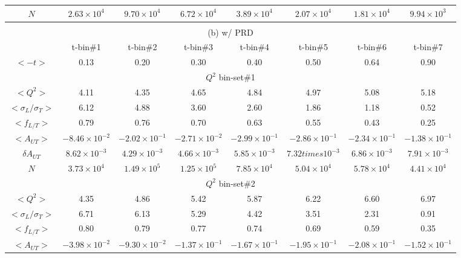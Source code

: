 \begin{table}[!ht]
\begin{tabular}{|c|c|c|c|c|c|c|c|}
	   $N$                     & $2.63\times 10^{4}$   &$9.70\times 10^{4}$   & $6.72\times 10^{4}$   &  $3.89\times 10^{4}$  & $2.07\times 10^{4}$  &  $1.81\times 10^{4}$ &$9.94\times 10^{3}$  \\
     \hline
	  \multicolumn{8}{c}{} \\
	  \multicolumn{8}{c}{ (b) w/ PRD} \\
	   \hline
	     &  t-bin\#1 & t-bin\#2 & t-bin\#3 & t-bin\#4 & t-bin\#5 & t-bin\#6 & t-bin\#7 \\
     	\hline 
		    $<-t>$                &  0.13 & 0.20   & 0.30   & 0.40   & 0.50   & 0.64   & 0.90  \\
	    \hline
   	   \multicolumn{8}{|c|}{$Q^{2}$ bin-set\#1 } \\
   	    \hline
   	   $<Q^{2}>$          & 4.11  & 4.35   & 4.65   & 4.84   & 4.97   & 5.08  & 5.18  \\
   	   $<\sigma_{L}/\sigma_{T}>$ & 6.12 & 4.88 & 3.60 & 2.60 & 1.86 & 1.18 & 0.52 \\
   	   $<f_{L/T}>$        & 0.79 & 0.76 & 0.70 & 0.63 & 0.55 & 0.43 & 0.25 \\
	   $<A_{UT}>$        &$-8.46\times 10^{-2}$   & $-2.02\times 10^{-1}$   & $-2.71\times 10^{-2}$    & $-2.99\times 10^{-1}$    & $-2.86\times 10^{-1}$    & $-2.34\times 10^{-1}$   & $-1.38\times 10^{-1}$   \\
	   $\delta A_{UT}$  &  $8.62\times 10^{-3}$   & $4.29\times 10^{-3}$    &   $4.66\times 10^{-3}$  &  $5.85\times 10^{-3}$    &  $7.32times 10^{-3}$   &   $6.86\times 10^{-3}$ &   $7.91\times 10^{-3}$ \\
	   $N$                     & $3.73\times 10^{4}$   &$1.49\times 10^{5}$   & $1.25\times 10^{5}$   &  $7.85\times 10^{4}$  & $5.04\times 10^{4}$  &  $5.78\times 10^{4}$ &$4.41\times 10^{4}$  \\
  \hline
     	   \multicolumn{8}{|c|}{$Q^{2}$ bin-set\#2 } \\
  \hline 
   	   $<Q^{2}>$          & 4.35  & 4.86   & 5.42   & 5.87   & 6.22   & 6.60  & 6.97  \\
	   $<\sigma_{L}/\sigma_{T}>$ & 6.71 & 6.13 & 5.29 & 4.42 & 3.51 & 2.31 & 0.91 \\
   	   $<f_{L/T}>$        & 0.80 & 0.79 & 0.77 & 0.74 & 0.69 & 0.59 & 0.35 \\
	   $<A_{UT}>$        &$-3.98\times 10^{-2}$   & $-9.30\times 10^{-2}$   & $-1.37\times 10^{-1}$    & $-1.67\times 10^{-1}$    & $-1.95\times 10^{-1}$    & $-2.08\times 10^{-1}$   & $-1.52\times 10^{-1}$   \\

\end{tabular}
\end{table}
